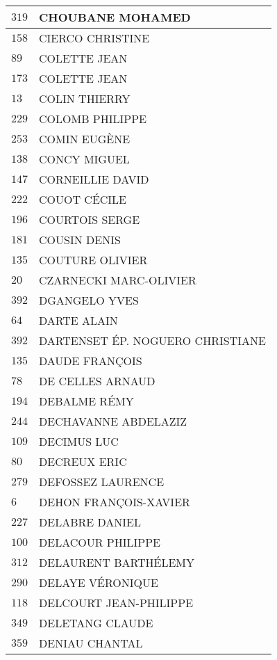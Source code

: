\begin{xltabular}{\linewidth}{|l|X|}
    \hline
    $319$ & CHOUBANE MOHAMED \\
    \hline
    $158$ & CIERCO CHRISTINE \\
    \hline
    $89$ & COLETTE JEAN \\
    \hline
    $173$ & COLETTE JEAN \\
    \hline
    $13$ & COLIN THIERRY \\
    \hline
    $229$ & COLOMB PHILIPPE \\
    \hline
    $253$ & COMIN EUGÈNE \\
    \hline
    $138$ & CONCY MIGUEL \\
    \hline
    $147$ & CORNEILLIE DAVID \\
    \hline
    $222$ & COUOT CÉCILE \\
    \hline
    $196$ & COURTOIS SERGE \\
    \hline
    $181$ & COUSIN DENIS \\
    \hline
    $135$ & COUTURE OLIVIER \\
    \hline
    $20$ & CZARNECKI MARC-OLIVIER \\
    \hline
    $392$ & DGANGELO YVES \\
    \hline
    $64$ & DARTE ALAIN \\
    \hline
    $392$ & DARTENSET ÉP. NOGUERO CHRISTIANE \\
    \hline
    $135$ & DAUDE FRANÇOIS \\
    \hline
    $78$ & DE CELLES ARNAUD \\
    \hline
    $194$ & DEBALME RÉMY \\
    \hline
    $244$ & DECHAVANNE ABDELAZIZ \\
    \hline
    $109$ & DECIMUS LUC \\
    \hline
    $80$ & DECREUX ERIC \\
    \hline
    $279$ & DEFOSSEZ LAURENCE \\
    \hline
    $6$ & DEHON FRANÇOIS-XAVIER \\
    \hline
    $227$ & DELABRE DANIEL \\
    \hline
    $100$ & DELACOUR PHILIPPE \\
    \hline
    $312$ & DELAURENT BARTHÉLEMY \\
    \hline
    $290$ & DELAYE VÉRONIQUE \\
    \hline
    $118$ & DELCOURT JEAN-PHILIPPE \\
    \hline
    $349$ & DELETANG CLAUDE \\
    \hline
    $359$ & DENIAU CHANTAL \\

\end{xltabular}
